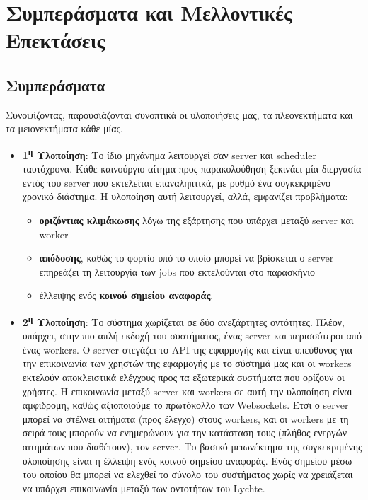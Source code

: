 \chapter{Συμπεράσματα και Μελλοντικές Επεκτάσεις}
\label{chapter:end}

\section{Συμπεράσματα}
\label{section:conclusion}

Συνοψίζοντας, παρουσιάζονται συνοπτικά οι υλοποιήσεις μας, τα πλεονεκτήματα και τα μειονεκτήματα κάθε μίας.

\begin{itemize}
	\item \textbf{1\textsuperscript{η} Υλοποίηση}: Το ίδιο μηχάνημα λειτουργεί σαν server και scheduler ταυτόχρονα.
		Κάθε καινούργιο αίτημα προς παρακολούθηση ξεκινάει μία διεργασία εντός του server που εκτελείται επαναληπτικά,
		με ρυθμό ένα συγκεκριμένο χρονικό διάστημα. Η υλοποίηση αυτή λειτουργεί, αλλά, εμφανίζει προβλήματα:
		\begin{itemize}
			\item \textbf{οριζόντιας κλιμάκωσης} λόγω της εξάρτησης που υπάρχει μεταξύ server και worker
			\item \textbf{απόδοσης}, καθώς το φορτίο υπό το οποίο μπορεί να βρίσκεται ο server επηρεάζει τη λειτουργία των jobs που εκτελούνται στο παρασκήνιο 
			\item έλλειψης ενός \textbf{κοινού σημείου αναφοράς}.
		\end{itemize}
	\item \textbf{2\textsuperscript{η} Υλοποίηση}: Το σύστημα χωρίζεται σε δύο ανεξάρτητες οντότητες. Πλέον,
		υπάρχει, στην πιο απλή εκδοχή του συστήματος, ένας server και περισσότεροι από ένας workers. Ο server στεγάζει το API της εφαρμογής και είναι υπεύθυνος
		για την επικοινωνία των χρηστών της εφαρμογής με το σύστημά μας και οι workers εκτελούν αποκλειστικά ελέγχους προς
		τα εξωτερικά συστήματα που ορίζουν οι χρήστες. Η επικοινωνία μεταξύ server και workers σε αυτή την υλοποίηση είναι αμφίδρομη,
		καθώς αξιοποιούμε το πρωτόκολλο των Websockets. Έτσι ο server μπορεί να στέλνει αιτήματα (προς έλεγχο) στους workers,
		και οι workers με τη σειρά τους μπορούν να ενημερώνουν για την κατάσταση τους (πλήθος ενεργών αιτημάτων που διαθέτουν), τον server.
		Το βασικό μειωνέκτημα της συγκεκριμένης υλοποίησης είναι η έλλειψη ενός κοινού σημείου αναφοράς. Ενός σημείου μέσω του οποίου
		θα μπορεί να ελεχθεί το σύνολο του συστήματος χωρίς να χρειάζεται να υπάρχει επικοινωνία μεταξύ των οντοτήτων του Lychte. 

\end{itemize}
